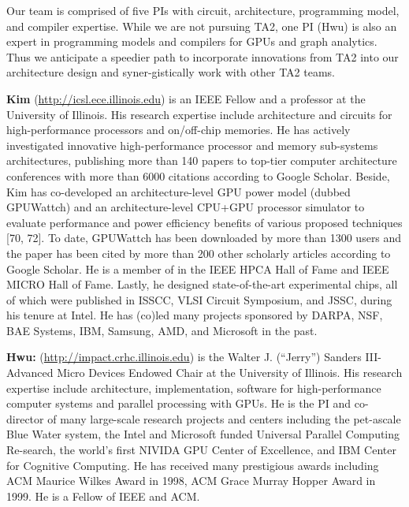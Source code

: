 Our team is comprised of five PIs with circuit, architecture, programming model, and compiler expertise. 
While we are not pursuing TA2, one PI (Hwu) is also an expert in programming models and compilers for GPUs and graph analytics. 
Thus we anticipate a speedier path to incorporate innovations from TA2 into our architecture design and syner-gistically work with other TA2 teams.

\noindent
\textbf{Kim} (\url{http://icsl.ece.illinois.edu}) is an IEEE Fellow and a professor at the University of Illinois. 
His research expertise include architecture and circuits for high-performance processors and on/off-chip memories. 
He has actively investigated innovative high-performance processor and memory sub-systems architectures, publishing more than 140 papers to top-tier computer architecture conferences with more than 6000 citations according to Google Scholar. 
Beside, Kim has co-developed an architecture-level GPU power model (dubbed GPUWattch) and an architecture-level CPU+GPU processor simulator to evaluate performance and power efficiency benefits of various proposed techniques [70, 72]. 
To date, GPUWattch has been downloaded by more than 1300 users and the paper has been cited by more than 200 other scholarly articles according to Google Scholar. 
He is a member of in the IEEE HPCA Hall of Fame and IEEE MICRO Hall of Fame. Lastly, he designed state-of-the-art experimental chips, all of which were published in ISSCC, VLSI Circuit Symposium, and JSSC, during his tenure at Intel.
He has (co)led many projects sponsored by DARPA, NSF, BAE Systems, IBM, Samsung, AMD, and Microsoft in the past. 

\noindent
\textbf{Hwu:} (\url{http://impact.crhc.illinois.edu}) is the Walter J. (``Jerry'') Sanders III-Advanced Micro Devices Endowed Chair at the University of Illinois. 
His research expertise include architecture, implementation, software for high-performance computer systems and parallel processing with GPUs. 
He is the PI and co-director of many large-scale research projects and centers including the pet-ascale Blue Water system, the Intel and Microsoft funded Universal Parallel Computing Re-search, the world’s first NIVIDA GPU Center of Excellence, and IBM Center for Cognitive Computing. 
He has received many prestigious awards including ACM Maurice Wilkes Award in 1998, ACM Grace Murray Hopper Award in 1999. He is a Fellow of IEEE and ACM.

